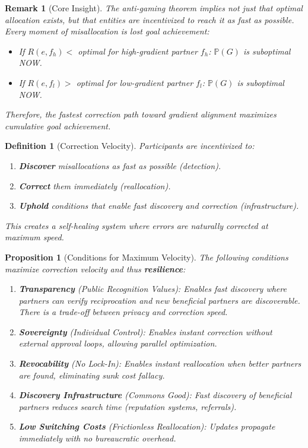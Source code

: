 \documentclass[11pt]{article}
\newtheorem{definition}{Definition}
\newtheorem{proposition}{Proposition}
\newtheorem{remark}{Remark}
\begin{document}
\begin{remark}[Core Insight]
The anti-gaming theorem implies not just that optimal allocation exists, but that entities are incentivized to reach it as fast as possible. Every moment of misallocation is lost goal achievement:
\begin{itemize}
    \item If $R(e, f_h) <$ optimal for high-gradient partner $f_h$: $\mathbb{P}(G)$ is suboptimal NOW.
    \item If $R(e, f_l) >$ optimal for low-gradient partner $f_l$: $\mathbb{P}(G)$ is suboptimal NOW.
\end{itemize}
Therefore, the fastest correction path toward gradient alignment maximizes cumulative goal achievement.
\end{remark}

\begin{definition}[Correction Velocity]
Participants are incentivized to:
\begin{enumerate}
    \item \textbf{Discover} misallocations as fast as possible (detection).
    \item \textbf{Correct} them immediately (reallocation).
    \item \textbf{Uphold} conditions that enable fast discovery and correction (infrastructure).
\end{enumerate}
This creates a self-healing system where errors are naturally corrected at maximum speed.
\end{definition}

\begin{proposition}[Conditions for Maximum Velocity]
The following conditions maximize correction velocity and thus \textbf{resilience}:
\begin{enumerate}
    \item \textbf{Transparency} (Public Recognition Values): Enables fast discovery where partners can verify reciprocation and new beneficial partners are discoverable. There is a trade-off between privacy and correction speed.
    \item \textbf{Sovereignty} (Individual Control): Enables instant correction without external approval loops, allowing parallel optimization.
    \item \textbf{Revocability} (No Lock-In): Enables instant reallocation when better partners are found, eliminating sunk cost fallacy.
    \item \textbf{Discovery Infrastructure} (Commons Good): Fast discovery of beneficial partners reduces search time (reputation systems, referrals).
    \item \textbf{Low Switching Costs} (Frictionless Reallocation): Updates propagate immediately with no bureaucratic overhead.
\end{enumerate}
\end{proposition}
\end{document}
